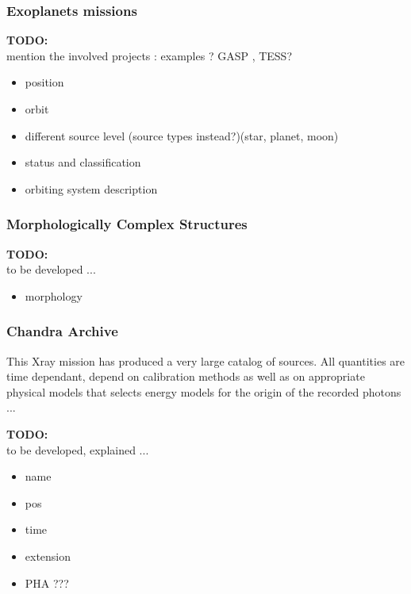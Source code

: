 \documentclass[11pt,a4paper]{ivoa}
\newcommand{\TODO}[1]{%
    \noindent%
    \colorbox{todocolor}{%
            \parbox{0.85\linewidth}{\sffamily \textbf{TODO:}\\
            #1}
    }%
    \vspace{2pt}

}
\begin{document}
\subsubsection{Exoplanets missions}
\TODO{mention the involved projects : examples ? GASP , TESS? }

\begin{itemize}
    \item position
    \item orbit
    \item different source level (source types instead?)(star, planet, moon)
    \item status and classification
    \item orbiting system description
\end{itemize}

\subsubsection{Morphologically Complex Structures}

\TODO{to be developed ...}
\begin{itemize}
    \item morphology
\end{itemize}

\subsubsection{Chandra Archive}
This Xray mission has produced a very large catalog of sources. %
All quantities are time dependant, depend on calibration methods as well as on appropriate physical
models that selects energy models for the origin of the recorded photons ...
\TODO{to be developed, explained ...}
\begin{itemize}
    \item name
    \item pos
    \item time
    \item extension
    \item PHA ???
\end{itemize}
\end{document}
